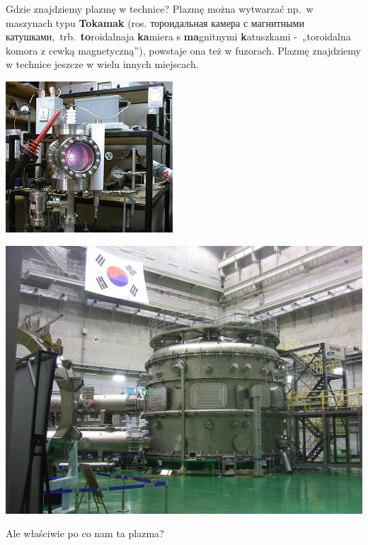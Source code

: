 \documentclass[10pt]{beamer}
\begin{document}
    \begin{frame}{Gdzie znajdziemy plazmę w technice?}
        Plazmę można wytwarzać np.\ w maszynach typu \textbf{Tokamak} (ros. \foreignlanguage{russian}{тороидальная камера с магнитными катушками},\ trb.\ \textbf{to}roidalnaja \textbf{ka}miera s \textbf{ma}gnitnymi \textbf{k}atuszkami -\ „toroidalna komora z cewką magnetyczną”), powstaje ona też w fuzorach. Plazmę znajdziemy w technice jeszcze w wielu innych miejscach.
        \begin{minipage}{0.49\textwidth}
            \centering
            \includegraphics[width=0.8\linewidth]{fusor.jpeg}
        \end{minipage}
        \hfill
        \begin{minipage}{0.49\textwidth}
            \centering
            \includegraphics[width=0.8\linewidth]{tokamak.jpg}
        \end{minipage}
        Ale właściwie po co nam ta plazma?
    \end{frame}
\end{document}
